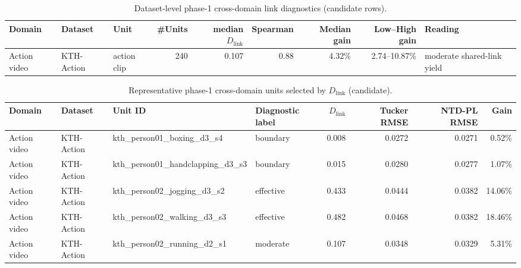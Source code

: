 
\begin{table}[t]
\centering
\caption{Dataset-level phase-1 cross-domain link diagnostics (candidate rows).}
\begin{tabular}{@{}l l l r r r r r l@{}}
\toprule
Domain & Dataset & Unit & \#Units & median $D_{\mathrm{link}}$ & Spearman & Median gain & Low--High gain & Reading \\
\midrule
Action video & KTH-Action & action clip & 240 & 0.107 & 0.88 & 4.32\% & 2.74--10.87\% & moderate shared-link yield \\
\bottomrule
\end{tabular}
\end{table}

\begin{table}[t]
\centering
\caption{Representative phase-1 cross-domain units selected by $D_{\mathrm{link}}$ (candidate).}
\begin{tabular}{@{}l l l l r r r r@{}}
\toprule
Domain & Dataset & Unit ID & Diagnostic label & $D_{\mathrm{link}}$ & Tucker RMSE & NTD-PL RMSE & Gain \\
\midrule
Action video & KTH-Action & kth_person01_boxing_d3_s4 & boundary & 0.008 & 0.0272 & 0.0271 & 0.52\% \\
Action video & KTH-Action & kth_person01_handclapping_d3_s3 & boundary & 0.015 & 0.0280 & 0.0277 & 1.07\% \\
Action video & KTH-Action & kth_person02_jogging_d3_s2 & effective & 0.433 & 0.0444 & 0.0382 & 14.06\% \\
Action video & KTH-Action & kth_person02_walking_d3_s3 & effective & 0.482 & 0.0468 & 0.0382 & 18.46\% \\
Action video & KTH-Action & kth_person02_running_d2_s1 & moderate & 0.107 & 0.0348 & 0.0329 & 5.31\% \\
\bottomrule
\end{tabular}
\end{table}

